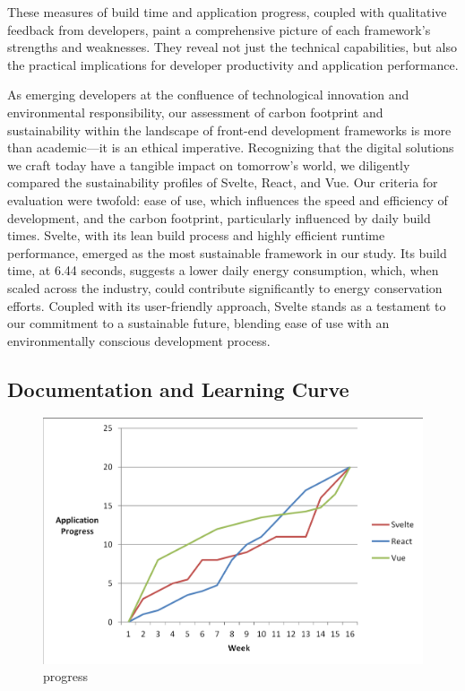 These measures of build time and application progress, coupled with qualitative feedback from developers, paint a comprehensive picture of each framework's strengths and weaknesses. They reveal not just the technical capabilities, but also the practical implications for developer productivity and application performance.

As emerging developers at the confluence of technological innovation and environmental responsibility, our assessment of carbon footprint and sustainability within the landscape of front-end development frameworks is more than academic—it is an ethical imperative. Recognizing that the digital solutions we craft today have a tangible impact on tomorrow's world, we diligently compared the sustainability profiles of Svelte, React, and Vue. Our criteria for evaluation were twofold: ease of use, which influences the speed and efficiency of development, and the carbon footprint, particularly influenced by daily build times. Svelte, with its lean build process and highly efficient runtime performance, emerged as the most sustainable framework in our study. Its build time, at 6.44 seconds, suggests a lower daily energy consumption, which, when scaled across the industry, could contribute significantly to energy conservation efforts. Coupled with its user-friendly approach, Svelte stands as a testament to our commitment to a sustainable future, blending ease of use with an environmentally conscious development process.

\subsection{Documentation and Learning Curve}

\begin{figure}[!htbp]
\centering
\includegraphics[width=\linewidth]{figs/progress.png}
\caption{progress}
\label{fig:progress}
\end{figure}

